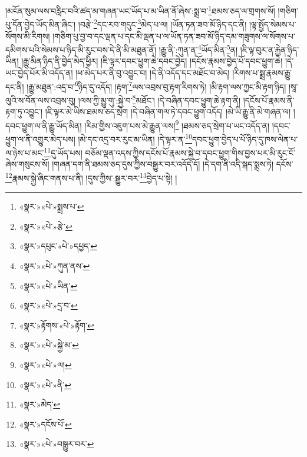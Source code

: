 །མངོན་སུམ་ལས་བརླིང་བའི་ཚད་མ་གཞན་ཡང་ཡོད་པ་མ་ཡིན་ནོ་ཞེས་:སྨྲ་བ་\footnote{«སྣར་»«པེ་»སྨྲས་པ་}ཐམས་ཅད་ལ་གྲགས་སོ། །གཅིག་པུ་དོན་བྱེད་ཡོད་མིན་ཞིང་། །བརྩེ་\footnote{«སྣར་»«པེ་»རྩེ་}དང་རབ་གདུང་\footnote{«སྣར་»དཔུང་«པེ་»དཔྱད་}མེད་པ་ལ། །ཡོན་ཏན་ཟབ་མོ་ཉིད་དང་ནི། །ལྟ་སྤྱོད་སེམས་པ་སོགས་མི་རིགས། །གཅིག་པུ་བྱ་བ་དང་ལྡན་པ་དང་མི་ལྡན་པ་ལ་ཡོན་ཏན་ཟབ་མོ་ཉིད་དམ་གཟུགས་ལ་སོགས་པ་དམིགས་པའི་སེམས་པ་ཉིད་མི་རུང་བས་དེ་ནི་མི་མཐུན་ནོ། །རྒྱུ་ནི་:ཀུན་ན་\footnote{«སྣར་»«པེ་»ཀུན་ནས་}ཡོད་མིན་\footnote{«སྣར་»«པེ་»ཡིན་}ན། །ཇི་ལྟ་བུར་ན་རྐྱེན་ཉིད་ཡིན། །རྒྱུ་མིན་ཉིད་ནི་བྱེད་མེད་ཕྱིར། །ཇི་ལྟར་དབང་ཕྱུག་ཆེ་དབང་བྱེད། །དངོས་རྣམས་བྱེད་པོ་དབང་ཕྱུག་ཆེ། །དེ་ཡང་བྱེད་པོར་མི་འདོད་ན། །ཕ་མེད་པར་ནི་བུ་འབྱུང་བ། །དེ་ནི་འདོད་དང་མཐོང་བ་མེད། །རིགས་པ་སྨྲ་རྣམས་རྒྱུ་དང་ནི། །རྒྱུ་མཐུན་:འདྲ་བ་\footnote{«སྣར་»«པེ་»དྲ་བ་}ཉིད་དུ་འདོད། །རྟག་\footnote{«སྣར་»རྟོགས་«པེ་»རྟོག་}ལས་འབྲས་བུ་རྟག་རིགས་ཏེ། །མི་རྟག་ལས་ཀྱང་མི་རྟག་ཉིད། །སཱ་ལུའི་ས་བོན་ལས་འབྲས་བུ། །ལས་ཀྱི་མྱུ་གུ་:སྐྱེ་བ་\footnote{«སྣར་»«པེ་»སྐྱེ་མ་}མཐོང་། །དེ་བཞིན་དབང་ཕྱུག་ཆེ་རྟག་ནི། །དངོས་པོ་རྣམས་ནི་རྟག་ཏུ་འབྱུང་། །ཇི་ལྟར་མེ་ཡིས་ཐམས་ཅད་སྲེག །དེ་བཞིན་གལ་ཏེ་དབང་ཕྱུག་འདོད། །མེ་ཡི་རྒྱུ་ནི་མེ་གཞན་ལ། །དབང་ཕྱུག་ལ་ནི་རྒྱུ་ཡོད་མིན། །རིམ་གྱིས་འཇུག་པས་མེ་རྒྱུན་ལས།\footnote{«སྣར་»«པེ་»ལ།} །ཐམས་ཅད་སྲེག་པ་ཡང་འདོད་ན། །དབང་ཕྱུག་ལ་ནི་འགྱུར་མེད་པས། །མེ་དང་འདྲ་བར་རུང་མ་ཡིན། །དེ་ལྟར་ན་\footnote{«སྣར་»«པེ་»ནི་}དབང་ཕྱུག་བྱེད་པ་པོ་ཉིད་དུ་ཁས་ལེན་པ་ལ་ཉེས་པ་མང་\footnote{«སྣར་»མེད་}དུ་ཡོད་པས། བཅོམ་ལྡན་འདས་ཀྱིས་དངོས་པོ་རྣམས་སྐྱེ་བ་དབང་ཕྱུག་གིས་བྱས་པར་མི་རུང་ངོ་ཞེས་གསུངས་སོ། །གཞན་དག་ནི་ཐམས་ཅད་དུས་ཀྱིས་བསྒྱུར་བར་འདོད་དོ། །དེ་དག་ནི་འདི་སྐད་སྨྲས་ཏེ། དངོས་\footnote{«སྣར་»དངོས་པོ་}རྣམས་སྐྱེ་ཞིང་གནས་པ་ནི། །དུས་ཀྱིས་:སྒྱུར་བར་\footnote{«སྣར་»«པེ་»བསྒྱུར་བར་}བྱེད་པ་སྟེ། །

